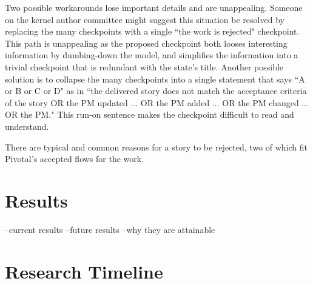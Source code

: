 \documentclass[preprint,12pt,3p]{elsarticle}
\begin{document}
Two possible workarounds lose important details and are unappealing. Someone on the kernel author committee might suggest this situation be resolved by replacing the many checkpoints with a single ``the work is rejected" checkpoint. This path is unappealing as the proposed checkpoint both looses interesting information by dumbing-down the model, and simplifies the information into a trivial checkpoint that is redundant with the state's title. Another possible solution is to collapse the many checkpoints into a single statement that says ``A or B or C or D" as in ``the delivered story does not match the acceptance criteria of the story OR the PM updated ... OR the PM added ... OR the PM changed ... OR the PM." This run-on sentence makes the checkpoint difficult to read and understand. 

There are typical and common reasons for a story to be rejected, two of which fit Pivotal's accepted flows for the work. 

\section{Results}

--current results
--future results
--why they are attainable

\appendix
\section{Research Timeline}
\label{appendix}
\end{document}
